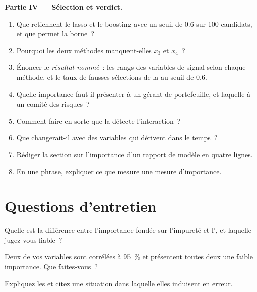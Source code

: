 \begin{problem}
\medskip\noindent\textbf{Partie IV --- Sélection et verdict.}
\begin{enumerate}[resume]
\item Que retiennent le lasso et le boosting avec un seuil de 0.6 sur 100 candidats, et que permet la borne~?
\item Pourquoi les deux méthodes manquent-elles $x_3$ et $x_4$~?
\item Énoncer le \emph{résultat nommé}~: les rangs des variables de signal selon chaque méthode, et le taux de fausses
sélections de la  au seuil de 0.6.
\item Quelle importance faut-il présenter à un gérant de portefeuille, et laquelle à un comité des risques~?
\item Comment faire en sorte que la  détecte l'interaction~?
\item Que changerait-il avec des variables qui dérivent dans le temps~?
\item Rédiger la section sur l'importance d'un rapport de modèle en quatre lignes.
\item En une phrase, expliquer ce que mesure une mesure d'importance.
\end{enumerate}
\end{problem}

\section{Questions d'entretien}

\begin{interviewq}\label{iq:ml:feature-engineering-selection-and-importance:1}
Quelle est la différence entre l'importance fondée sur l'impureté et l', et laquelle jugez-vous fiable~?
\end{interviewq}

\begin{interviewq}\label{iq:ml:feature-engineering-selection-and-importance:2}
Deux de vos variables sont corrélées à 95~\% et présentent toutes deux une faible importance. Que faites-vous~?
\end{interviewq}

\begin{interviewq}\label{iq:ml:feature-engineering-selection-and-importance:3}
Expliquez les  et citez une situation dans laquelle elles induisent en erreur.
\end{interviewq}

